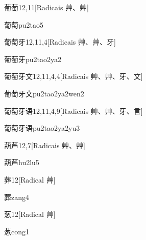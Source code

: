 \begin{entry}{葡萄}{12,11}[Radicais ⾋、⾋]
  \begin{phonetics}{葡萄}{pu2tao5}
  \end{phonetics}
\end{entry}

\begin{entry}{葡萄牙}{12,11,4}[Radicais ⾋、⾋、⽛]
  \begin{phonetics}{葡萄牙}{pu2tao2ya2}
  \end{phonetics}
\end{entry}

\begin{entry}{葡萄牙文}{12,11,4,4}[Radicais ⾋、⾋、⽛、⽂]
  \begin{phonetics}{葡萄牙文}{pu2tao2ya2wen2}
  \end{phonetics}
\end{entry}

\begin{entry}{葡萄牙语}{12,11,4,9}[Radicais ⾋、⾋、⽛、⾔]
  \begin{phonetics}{葡萄牙语}{pu2tao2ya2yu3}
  \end{phonetics}
\end{entry}

\begin{entry}{葫芦}{12,7}[Radicais ⾋、⾋]
  \begin{phonetics}{葫芦}{hu2lu5}
  \end{phonetics}
\end{entry}

\begin{entry}{葬}{12}[Radical ⾋]
  \begin{phonetics}{葬}{zang4}
  \end{phonetics}
\end{entry}

\begin{entry}{葱}{12}[Radical ⾋]
  \begin{phonetics}{葱}{cong1}
  \end{phonetics}
\end{entry}

